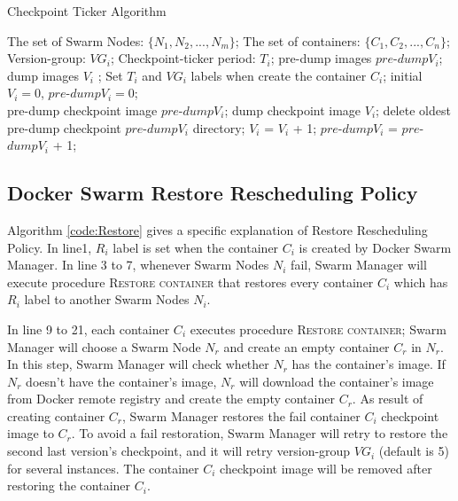 \begin{algorithm}[h]
    \caption{Checkpoint Ticker Algorithm}
    \label{code:checkpointTicker}
    \begin{algorithmic}[1]
	\Require
		The set of Swarm Nodes: $\lbrace N_1,N_2,...,N_m \rbrace $;
		The set of containers: $\lbrace C_1,C_2,...,C_n \rbrace$;
		Version-group: $ VG_i $;
		Checkpoint-ticker period: $ T_i $;
	\Ensure
		pre-dump images $ pre$-$dump V_i $; dump images $ V_i $ ;
        \State Set $ T_i $ and $ VG_i $ labels when create the container $ C_i $;
        \State initial $ V_i=0 $, $ pre$-$dump V_i=0 $;
        \\
					\State pre-dump checkpoint image $ pre $-$ dump V_i $;
				\EndIf
			\State dump checkpoint image $ V_i $;
                	\State delete oldest pre-dump checkpoint $ pre $-$ dump V_i $ directory;
				\EndIf
            	\State $ V_i $ = $ V_ i$ + 1;
          	      \State $ pre $-$ dump V_i $ = $ pre $-$ dump V_i $ + 1;
        	    \EndIf
     	   \EndWhile
        \EndFor
    \end{algorithmic}
\end{algorithm}

\subsection{Docker Swarm Restore Rescheduling Policy}
Algorithm \ref{code:Restore} gives a specific explanation of Restore Rescheduling Policy. In line1, $ R_i $ label is set when the container $C_i$ is created by Docker Swarm Manager.
In line 3 to 7, whenever Swarm Nodes $ N_i $ fail, Swarm Manager will execute procedure \textsc{Restore container} that restores every container $ C_i $ which has $ R_i $ label to another Swarm Nodes $ N_i $.

In line 9 to 21, each container $ C_i $ executes procedure \textsc{Restore container}; Swarm Manager will choose a Swarm Node $ N_r $ and create an empty container $ C_r $ in $ N_r $. In this step, Swarm Manager will check whether $ N_r $ has the container's image. If $ N_r $ doesn't have the container's image, $ N_r $ will download the container's image from Docker remote registry and create the empty container $ C_r $.
As result of creating container $ C_r $, Swarm Manager restores the fail container $ C_i $ checkpoint image to $ C_r $. To avoid a fail restoration, Swarm Manager will retry to restore the second last version's checkpoint, and it will retry version-group $ VG_i $ (default is 5) for several instances. The container $ C_i $ checkpoint image will be removed after restoring the container $ C_i $.


